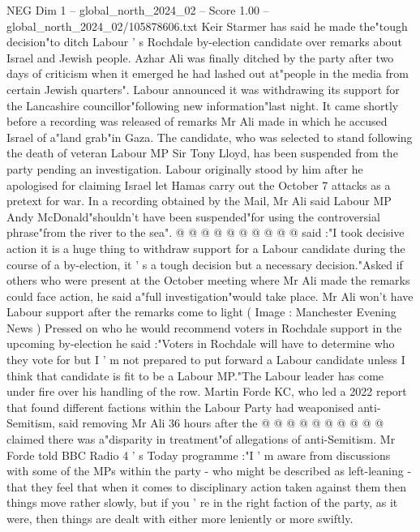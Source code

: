 \begin{textsample}{NEG Dim 1 – global\_north\_2024\_02 – Score 1.00 – global\_north\_2024\_02/105878606.txt}  \label{ex:f1_neg_356}
Keir Starmer has said he made the"tough decision"to ditch Labour ' s Rochdale by-election candidate over remarks about Israel and Jewish people.
Azhar Ali was finally ditched by the party after two days of criticism when it emerged he had lashed out at"people in the media from certain Jewish quarters".
Labour announced it was withdrawing its support for the Lancashire councillor"following new information"last night.
It came shortly before a recording was released of remarks Mr Ali made in which he accused Israel of a"land grab"in Gaza.
The candidate, who was selected to stand following the death of veteran Labour MP Sir Tony Lloyd, has been suspended from the party pending an investigation.
Labour originally stood by him after he apologised for claiming Israel let Hamas carry out the October 7 attacks as a pretext for war.
In a recording obtained by the Mail, Mr Ali said Labour MP Andy McDonald"shouldn't have been suspended"for using the controversial phrase"from the river to the sea". @ @ @ @ @ @ @ @ @ @ said :"I took decisive action it is a huge thing to withdraw support for a Labour candidate during the course of a by-election, it ' s a tough decision but a necessary decision."Asked if others who were present at the October meeting where Mr Ali made the remarks could face action, he said a"full investigation"would take place.
Mr Ali won't have Labour support after the remarks come to light ( Image : Manchester Evening News ) Pressed on who he would recommend voters in Rochdale support in the upcoming by-election he said :"Voters in Rochdale will have to determine who they vote for but I ' m not prepared to put forward a Labour candidate unless I think that candidate is fit to be a Labour MP."The Labour leader has come under fire over his handling of the row.
Martin Forde KC, who led a 2022 report that found different factions within the Labour Party had weaponised anti-Semitism, said removing Mr Ali 36 hours after the @ @ @ @ @ @ @ @ @ @ claimed there was a"disparity in treatment"of allegations of anti-Semitism.
Mr Forde told BBC Radio 4 ' s Today programme :"I ' m aware from discussions with some of the MPs within the party - who might be described as left-leaning - that they feel that when it comes to disciplinary action taken against them then things move rather slowly, but if you ' re in the right faction of the party, as it were, then things are dealt with either more leniently or more swiftly.

\end{textsample}
